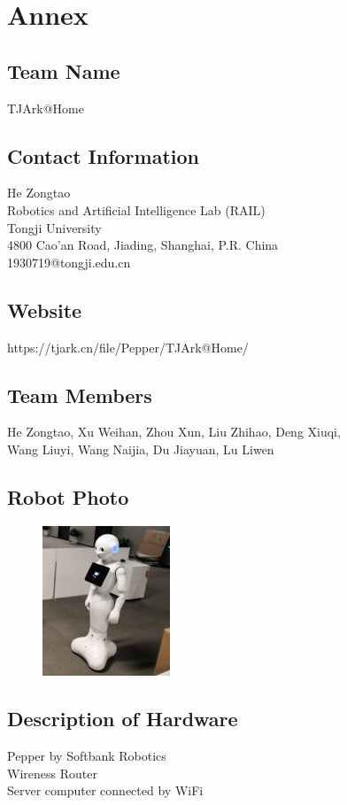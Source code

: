 \section*{Annex}
\label{sec:team}

\subsection*{Team Name}
TJArk@Home

\subsection*{Contact Information}
He Zongtao \\
Robotics and Artificial Intelligence Lab (RAIL) \\
Tongji University \\
4800 Cao'an Road, Jiading, Shanghai, P.R. China \\
1930719@tongji.edu.cn 

\subsection*{Website}
https://tjark.cn/file/Pepper/TJArk@Home/

\subsection*{Team Members}
He Zongtao, Xu Weihan, Zhou Xun, Liu Zhihao, Deng Xiuqi, \\
Wang Liuyi, Wang Naijia, Du Jiayuan, Lu Liwen

\subsection*{Robot Photo}
\begin{figure}[!h]
    \includegraphics[width=1.5in]{figs/pepper2.png}
\end{figure}

\subsection*{Description of Hardware}
Pepper by Softbank Robotics \\
Wireness Router \\
Server computer connected by WiFi \\

